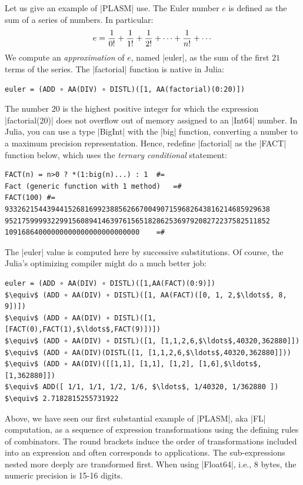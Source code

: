 \begin{script}
Let us give an example of |PLASM| use. The Euler number $e$ is defined as the 
sum of a series of numbers. In particular:
\[
e = {1\over 0!} + {1\over 1!} + {1\over 2!} + \cdots + {1\over n!} + \cdots
\]
We compute an \emph{approximation} of $e$, named |euler|,
as the sum of the first $21$ terms of the series.  The |factorial| function is native in 
Julia:
\begin{lstlisting}[language=JuliaLocal, style=julia, mathescape = true]
    euler = (ADD ∘ AA(DIV) ∘ DISTL)([1, AA(factorial)(0:20)])
\end{lstlisting}
The number 20 is the highest positive integer for which the expression |factorial(20)| does not overflow out of memory assigned to an |Int64| number. In Julia, you can use a type |BigInt| with the |big| function, converting a number to a maximum precision representation. 
Hence, redefine |factorial| as the |FACT| function below, which uses the \emph{ternary conditional} statement:

\begin{lstlisting}[language=JuliaLocal, style=julia, mathescape = true]
FACT(n) = n>0 ? *(1:big(n)...) : 1	#=
Fact (generic function with 1 method)	=#
FACT(100) #=
933262154439441526816992388562667004907159682643816214685929638
952175999932299156089414639761565182862536979208272237582511852
10916864000000000000000000000000	=#
\end{lstlisting}

The |euler| value is computed here by successive substitutions. Of course, the
Julia’s optimizing compiler might do a much better job:
\begin{lstlisting}[language=JuliaLocal, style=julia, mathescape = true]
euler = (ADD ∘ AA(DIV) ∘ DISTL)([1,AA(FACT)(0:9)])
$\equiv$ (ADD ∘ AA(DIV) ∘ DISTL)([1, AA(FACT)([0, 1, 2,$\ldots$, 8, 9])])
$\equiv$ (ADD ∘ AA(DIV) ∘ DISTL)([1, [FACT(0),FACT(1),$\ldots$,FACT(9)])])
$\equiv$ (ADD ∘ AA(DIV) ∘ DISTL)([1, [1,1,2,6,$\ldots$,40320,362880]])
$\equiv$ (ADD ∘ AA(DIV)(DISTL([1, [1,1,2,6,$\ldots$,40320,362880]]))
$\equiv$ (ADD ∘ AA(DIV)([[1,1], [1,1], [1,2], [1,6],$\ldots$,[1,362880]])
$\equiv$ ADD([ 1/1, 1/1, 1/2, 1/6, $\ldots$, 1/40320, 1/362880 ])
$\equiv$ 2.7182815255731922
\end{lstlisting}

Above, we have seen our first substantial example of |PLASM|, aka |FL| computation, as a sequence of expression transformations using the defining rules of combinators. The round brackets induce the order of transformations included into an expression and often corresponds to applications. The sub-expressions nested
more deeply are transformed first. When using |Float64|, i.e., 8 bytes, the numeric precision is 15-16 digits.


\end{script}
